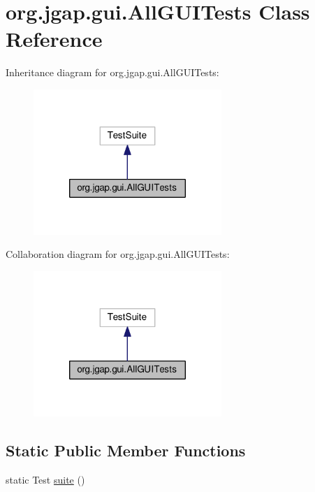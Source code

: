 \hypertarget{classorg_1_1jgap_1_1gui_1_1_all_g_u_i_tests}{\section{org.\-jgap.\-gui.\-All\-G\-U\-I\-Tests Class Reference}
\label{classorg_1_1jgap_1_1gui_1_1_all_g_u_i_tests}
}


Inheritance diagram for org.\-jgap.\-gui.\-All\-G\-U\-I\-Tests\-:
\nopagebreak
\begin{figure}[H]
\begin{center}
\leavevmode
\includegraphics[width=202pt]{classorg_1_1jgap_1_1gui_1_1_all_g_u_i_tests__inherit__graph}
\end{center}
\end{figure}


Collaboration diagram for org.\-jgap.\-gui.\-All\-G\-U\-I\-Tests\-:
\nopagebreak
\begin{figure}[H]
\begin{center}
\leavevmode
\includegraphics[width=202pt]{classorg_1_1jgap_1_1gui_1_1_all_g_u_i_tests__coll__graph}
\end{center}
\end{figure}
\subsection*{Static Public Member Functions}
\begin{DoxyCompactItemize}
\item 
static Test \hyperlink{classorg_1_1jgap_1_1gui_1_1_all_g_u_i_tests_a775e7e211f102bb003e33021d5cdfa45}{suite} ()
\end{DoxyCompactItemize}
